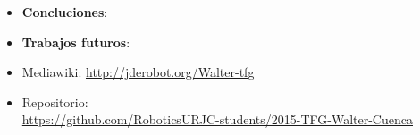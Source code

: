 \documentclass[notes,slidesec,a4]{seminar}
\begin{document}

\begin{hslide}
\begin{itemize}
\item \textbf{Concluciones}:
\item \textbf{Trabajos futuros}:
\end{itemize}
\end{hslide}

\begin{hslide}
\begin{itemize}
\item Mediawiki: \url{http://jderobot.org/Walter-tfg}
\item Repositorio:\\ \url{https://github.com/RoboticsURJC-students/2015-TFG-Walter-Cuenca}
\end{itemize}
\end{hslide}
\end{document}
